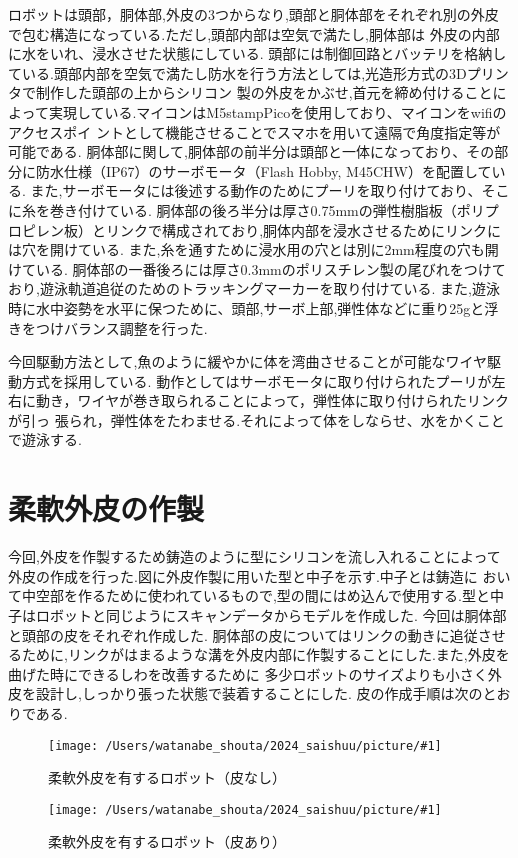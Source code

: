 \documentclass{jarticle}
\newcommand{\setPicture}[1]{\texttt{[image: /Users/watanabe\_shouta/2024\_saishuu/picture/\#1]}}
\begin{document}
ロボットは頭部，胴体部,外皮の3つからなり,頭部と胴体部をそれぞれ別の外皮で包む構造になっている.ただし,頭部内部は空気で満たし,胴体部は
外皮の内部に水をいれ、浸水させた状態にしている.
頭部には制御回路とバッテリを格納している.頭部内部を空気で満たし防水を行う方法としては,光造形方式の3Dプリンタで制作した頭部の上からシリコン
製の外皮をかぶせ,首元を締め付けることによって実現している.マイコンはM5stampPicoを使用しており、マイコンをwifiのアクセスポイ
ントとして機能させることでスマホを用いて遠隔で角度指定等が可能である.
胴体部に関して,胴体部の前半分は頭部と一体になっており、その部分に防水仕様（IP67）のサーボモータ（Flash Hobby, M45CHW）を配置している.
また,サーボモータには後述する動作のためにプーリを取り付けており、そこに糸を巻き付けている.
胴体部の後ろ半分は厚さ0.75mmの弾性樹脂板（ポリプロピレン板）とリンクで構成されており,胴体内部を浸水させるためにリンクには穴を開けている.
また,糸を通すために浸水用の穴とは別に2mm程度の穴も開けている.
胴体部の一番後ろには厚さ0.3mmのポリスチレン製の尾びれをつけており,遊泳軌道追従のためのトラッキングマーカーを取り付けている.
また,遊泳時に水中姿勢を水平に保つために、頭部,サーボ上部,弾性体などに重り25gと浮きをつけバランス調整を行った.

今回駆動方法として,魚のように緩やかに体を湾曲させることが可能なワイヤ駆動方式を採用している.
動作としてはサーボモータに取り付けられたプーリが左右に動き，ワイヤが巻き取られることによって，弾性体に取り付けられたリンクが引っ
張られ，弾性体をたわませる.それによって体をしならせ、水をかくことで遊泳する.

\section{柔軟外皮の作製}
今回,外皮を作製するため鋳造のように型にシリコンを流し入れることによって外皮の作成を行った.図に外皮作製に用いた型と中子を示す.中子とは鋳造に
おいて中空部を作るために使われているもので,型の間にはめ込んで使用する.型と中子はロボットと同じようにスキャンデータからモデルを作成した.
今回は胴体部と頭部の皮をそれぞれ作成した.
胴体部の皮についてはリンクの動きに追従させるために,リンクがはまるような溝を外皮内部に作製することにした.また,外皮を曲げた時にできるしわを改善するために
多少ロボットのサイズよりも小さく外皮を設計し,しっかり張った状態で装着することにした.
皮の作成手順は次のとおりである.

\begin{figure}[t]
   \centering
   \setPicture{skinless.jpg}
   \vspace*{-4mm}
   \caption{柔軟外皮を有するロボット（皮なし）}
   \label{fig:bandable-Torso}
\end{figure}
\begin{figure}[t]
   \centering
   \setPicture{withskin.jpg}
   \vspace*{-4mm}
   \caption{柔軟外皮を有するロボット（皮あり）}
   \label{fig:structure}
\end{figure}
\end{document}
